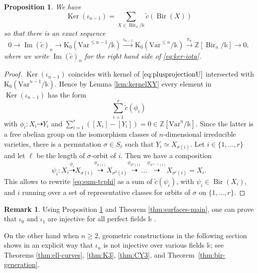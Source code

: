 \documentclass[a4paper,12pt]{amsart}
\def\k{\mathbb k}
\def\Z{\mathbb Z}
\def\Ker{{\operatorname{Ker}}}
\def\Image{{\operatorname{Im}}}
\def\Bir{{\operatorname{Bir}}}
\def\tc{\widetilde{c}}
\def\Kt{{\mathrm{K}}}
\def\Var{{\mathrm{Var}}}
\theoremstyle{plain}
\newtheorem{proposition}[dummy]{Proposition}
\numberwithin{equation}{section}
\theoremstyle{definition}
\newtheorem{remark}[dummy]{Remark}
\newcommand{\ti}[1]{\tilde{#1}}
\renewcommand{\(}{\left(}
\renewcommand{\)}{\right)}
\newcommand{\dto}{\dashrightarrow}
\begin{document}
\begin{proposition}\label{prop:ker-iota}
We have
\begin{equation}\label{eq:ker-iota}
\Ker(\iota_{n-1}) = \sum_{X \in \Bir_n/\k} \ti{c}(\Bir(X))
\end{equation}
so that there is an exact sequence
\begin{equation}\label{eq:seq-K0}
0 \to \Image(\ti{c})_n \to \Kt_0(\Var^{\le n-1}/\k) \overset{\iota_{n-1}}\to \Kt_0(\Var^{\le n}/\k) \overset{\pi_n}\to \Z[\Bir_n/\k] \to 0,
\end{equation}
where we write $\Image(\ti{c})_n$ for the right hand side
of \eqref{eq:ker-iota}.
\end{proposition}
\begin{proof}
$\Ker(\iota_{n-1})$ coincides with kernel of $\eqref{eq:plusprojectionU}$
intersected with $\Kt_0(\Var^{n-1}/\k)$.
Hence by Lemma \ref{lem:kernelXY} every element in
$\Ker(\iota_{n-1})$ has the form
\begin{equation}\label{eq:sum-tcphi}
\sum_{i=1}^r \tc(\phi_i)
\end{equation}
with $\phi_i: X_i \dto Y_i$
and $\sum_{i=1}^r ([X_i] - [Y_i]) = 0 \in \Z[\Var^n/\k]$.
Since the latter is a free abelian group on the isomorphism
classes of $n$-dimensional irreducible varieties,
there is a permutation $\sigma \in S_r$ such that
$Y_i \simeq X_{\sigma(i)}$. 
Let $i \in \{1, \dots, r\}$ and let $\ell$ be the length
of $\sigma$-orbit of $i$. Then we have a composition
\[
\psi_i: X_i \overset{\phi_i}{\dto} X_{\sigma(i)} \overset{\phi_{\sigma(i)}}{\dto} X_{\sigma^2(i)} \overset{\phi_{\sigma^2(i)}}{\dto} \dots
\overset{\phi_{\sigma^{\ell-1}(i)}}{\dto}
X_{\sigma^\ell(i)}  =  X_i. 
\]
This allows to rewrite \eqref{eq:sum-tcphi}
as a sum of $\tc(\psi_i)$, with $\psi_i \in \Bir(X_i)$,
and $i$ running over a set of representative classes
for orbits of $\sigma$ on $\{1, \dots, r\}$.
\end{proof}

\begin{remark}\label{rem:iota-injectivity}
Using Proposition \ref{prop:ker-iota}
and
Theorem \ref{thm:surfaces-main},
one can prove that 
$\iota_0$ and
$\iota_1$ are injective
for all perfect fields $\k$ \cite[Corollary 3.10]{LSZ20}.

On the other hand when $n \ge 2$, geometric constructions in the following
section 
shows in an explicit way that $\iota_n$ is not injective
over various fields $\k$;
see Theorems \ref{thm:ell-curves}, \ref{thm:K3}, 
\ref{thm:CY3}, and Theorem~\ref{thm:bir-generation}.
\end{remark}
\end{document}
